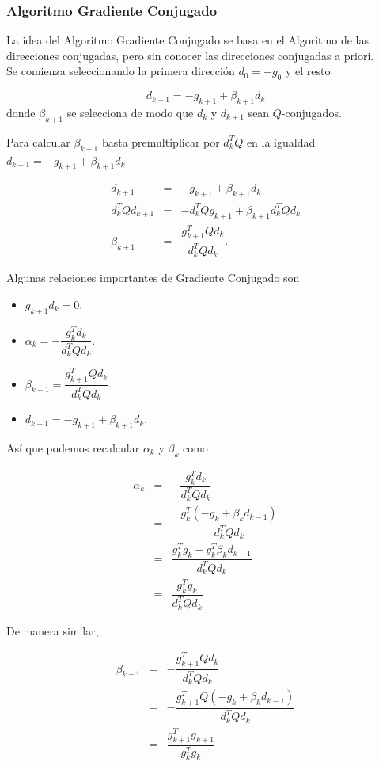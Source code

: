 \documentclass[11pt,letterpaper]{article}
\theoremstyle{definition}
\theoremstyle{definition}
\theoremstyle{definition}
\begin{document}
\subsubsection{Algoritmo Gradiente Conjugado}
La idea del Algoritmo Gradiente Conjugado se basa en el Algoritmo de las direcciones conjugadas, pero sin conocer las direcciones conjugadas a priori.
\\
Se comienza seleccionando la primera dirección $ d_0 = -g_0 $ y el resto
\begin{shaded*}
	\begin{equation}
		d_{k+1} = - g_{k+1} + \beta_{k+1} d_k
	\end{equation}
	donde $ \beta_{k+1} $ se selecciona de modo que $ d_k $ y $ d_{k+1} $ sean $ Q $-conjugados.
\end{shaded*}
Para calcular $ \beta_{k+1} $ basta premultiplicar por $ d_k^T Q $ en la igualdad $ d_{k+1} = - g_{k+1} + \beta_{k+1} d_k $
\begin{shaded*}
	\begin{eqnarray}
		d_{k+1}         & = & - g_{k+1} + \beta_{k+1} d_k \\
		d_k^T Q d_{k+1} & = & - d_k^T Q g_{k+1} + \beta_{k+1} d_k^T Q d_k \\
		\beta_{k+1}     & = & \dfrac{g_{k+1}^T Q d_k}{d_k^T Q d_k}.
	\end{eqnarray}
\end{shaded*}

Algunas relaciones importantes de Gradiente Conjugado son
\begin{shaded*}
	\begin{itemize}
		\item $ g_{k+1} d_k = 0 $.
		\item $ \alpha_k = - \dfrac{g_k^T d_k}{d_k^T Q d_k} $.
		\item $ \beta_{k+1} = \dfrac{g_{k+1}^T Q d_k}{d_k^T Q d_k} $.
		\item $ d_{k+1} = - g_{k+1} + \beta_{k+1} d_k $.
	\end{itemize}
\end{shaded*}
Así que podemos recalcular $ \alpha_k $ y $ \beta_k $ como
\begin{shaded*}
	\begin{eqnarray*}
		\alpha_k & = & - \dfrac{g_k^T d_k}{d_k^T Q d_k} \\
		         & = & - \dfrac{g_k^T (-g_k + \beta_k d_{k-1})}{d_k^T Q d_k} \\
		         & = & \dfrac{g_k^T g_k - g_k^T \beta_k d_{k-1}}{d_k^T Q d_k} \\
		         & = & \dfrac{g_k^T g_k}{d_k^T Q d_k}
	\end{eqnarray*}
\end{shaded*}
De manera similar, 
\begin{shaded*}
	\begin{eqnarray*}
		\beta_{k+1} & = & - \dfrac{g_{k+1}^T Q d_k}{d_k^T Q d_k} \\
		& = & - \dfrac{g_{k+1}^T Q(-g_k + \beta_k d_{k-1})}{d_k^T Q d_k} \\
		& = & \dfrac{g_{k+1}^T g_{k+1}}{g_k^T g_k}
	\end{eqnarray*}
\end{shaded*}
\end{document}
